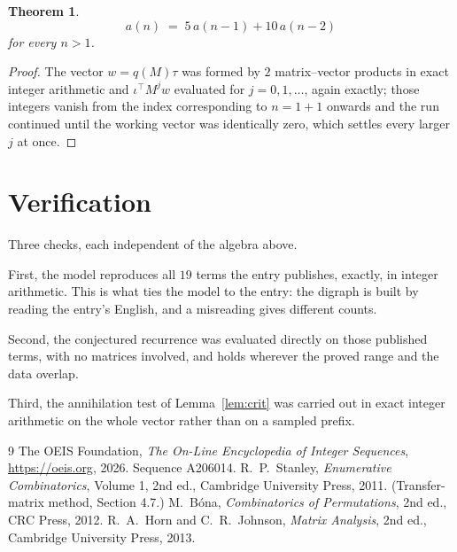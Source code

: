 \documentclass[11pt,a4paper]{article}
\theoremstyle{plain}
\newtheorem{theorem}{Theorem}
\theoremstyle{definition}
\begin{document}
\begin{theorem}
\[
a(n)\;=\;5\,a(n-1) + 10\,a(n-2)
\]
for every $n>1$.
\end{theorem}

\begin{proof}
The vector $w=q(M)\tau$ was formed by $2$ matrix--vector products in exact integer
arithmetic and $\iota^{\!\top}M^{j}w$ evaluated for $j=0,1,\dots$, again exactly; those
integers vanish from the index corresponding to $n=1+1$ onwards and the run continued
until the working vector was identically zero, which settles every larger $j$ at once.
\end{proof}

\section{Verification}

Three checks, each independent of the algebra above.

First, the model reproduces all $19$ terms the entry publishes, exactly, in integer
arithmetic. This is what ties the model to the entry: the digraph is built by reading the
entry's English, and a misreading gives different counts.

Second, the conjectured recurrence was evaluated directly on those published terms, with no
matrices involved, and holds wherever the proved range and the data overlap.

Third, the annihilation test of Lemma~\ref{lem:crit} was carried out in exact integer
arithmetic on the whole vector rather than on a sampled prefix.

\begin{thebibliography}{9}
 The OEIS Foundation, \emph{The On-Line Encyclopedia of Integer
Sequences}, \url{https://oeis.org}, 2026. Sequence A206014.
 R.~P.~Stanley, \emph{Enumerative Combinatorics}, Volume 1, 2nd ed.,
Cambridge University Press, 2011. (Transfer-matrix method, Section 4.7.)
 M.~B\'ona, \emph{Combinatorics of Permutations}, 2nd ed., CRC
Press, 2012.
 R.~A.~Horn and C.~R.~Johnson, \emph{Matrix Analysis}, 2nd ed., Cambridge
University Press, 2013.
\end{thebibliography}
\end{document}

